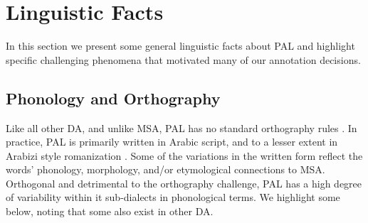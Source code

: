 \section*{Linguistic Facts}
%
\label{lingfacts}
In this section we present some general linguistic facts about PAL and highlight specific challenging phenomena that motivated many of our annotation decisions.

 
\subsection*{Phonology and Orthography}
Like all other DA, and unlike MSA, PAL has no standard orthography rules \citep{Jarrar:2016:curras,Habash:2018:unified}.  In practice, PAL is primarily written in Arabic script, and to a lesser extent in Arabizi style romanization \citep{Darwish:2014:arabizi}. Some of the variations in the written form reflect the words' phonology, morphology, and/or etymological connections to MSA.  Orthogonal and detrimental to the orthography challenge, PAL has a high degree of variability within it sub-dialects in phonological terms. We highlight some below, noting that some also exist in other DA.

